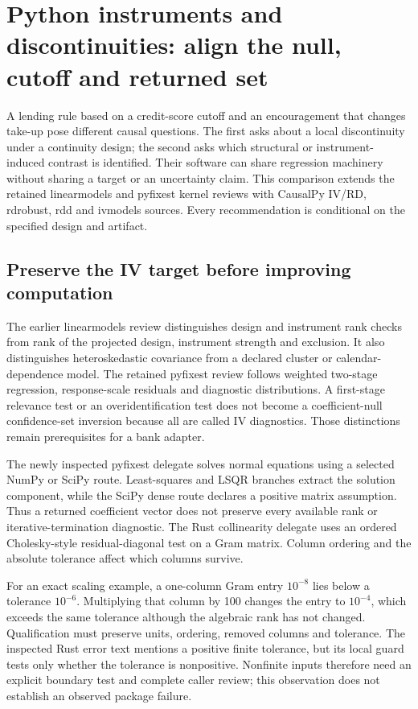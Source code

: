 \section{Python instruments and discontinuities: align the null, cutoff and returned set}
\label{sec:exec25-python-iv-rd}

A lending rule based on a credit-score cutoff and an encouragement that
changes take-up pose different causal questions. The first asks about a
local discontinuity under a continuity design; the second asks which
structural or instrument-induced contrast is identified. Their software
can share regression machinery without sharing a target or an uncertainty
claim. This comparison extends the retained linearmodels and pyfixest
kernel reviews with CausalPy IV/RD, rdrobust, rdd and ivmodels sources.
Every recommendation is conditional on the specified design and artifact.
\citep{exec25_pyrdiv_choice,exec22_pyiv_kernels_linearmodels,
exec22_pyiv_kernels_pyfixest}

\subsection{Preserve the IV target before improving computation}
The earlier linearmodels review distinguishes design and instrument rank
checks from rank of the projected design, instrument strength and exclusion.
It also distinguishes heteroskedastic covariance from a declared cluster or
calendar-dependence model. The retained pyfixest review follows weighted
two-stage regression, response-scale residuals and diagnostic distributions.
A first-stage relevance test or an overidentification test does not become
a coefficient-null confidence-set inversion because all are called IV
diagnostics. Those distinctions remain prerequisites for a bank adapter.
\citep{exec22_pyiv_kernels_linearmodels,exec22_pyiv_kernels_pyfixest,
exec22_pyiv_reference}

The newly inspected pyfixest delegate solves normal equations using a
selected NumPy or SciPy route. Least-squares and LSQR branches extract
the solution component, while the SciPy dense route declares a positive
matrix assumption. Thus a returned coefficient vector does not preserve
every available rank or iterative-termination diagnostic. The Rust
collinearity delegate uses an ordered Cholesky-style residual-diagonal
test on a Gram matrix. Column ordering and the absolute tolerance affect
which columns survive.\citep{exec25_pyrdiv_pyfixest}

For an exact scaling example, a one-column Gram entry $10^{-8}$ lies below
a tolerance $10^{-6}$. Multiplying that column by 100 changes the entry to
$10^{-4}$, which exceeds the same tolerance although the algebraic rank
has not changed. Qualification must preserve units, ordering, removed
columns and tolerance. The inspected Rust error text mentions a positive
finite tolerance, but its local guard tests only whether the tolerance is
nonpositive. Nonfinite inputs therefore need an explicit boundary test and
complete caller review; this observation does not establish an observed
package failure.\citep{exec25_pyrdiv_pyfixest,exec25_pyrdiv_choice}

